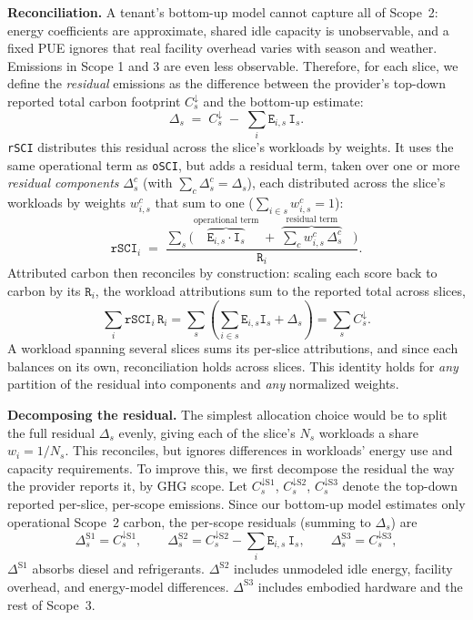 \documentclass[sigconf]{acmart}
\newcommand{\parag}[1]{\vspace{2mm}\noindent\textbf{#1.}\hspace{2mm}}
\newcommand{\RSCI}{\texttt{rSCI}\xspace}
\newcommand{\OSCI}{\texttt{oSCI}\xspace}
\newcommand{\E}{\texttt{E}\xspace}
\newcommand{\I}{\texttt{I}\xspace}
\newcommand{\R}{\texttt{R}\xspace}
\begin{document}
\parag{Reconciliation}
A tenant's bottom-up model cannot capture all of Scope~2: energy coefficients are approximate, shared idle capacity is unobservable, and a fixed PUE ignores that real facility overhead varies with season and weather.
Emissions in Scope 1 and 3 are even less observable.
Therefore, for each slice, we define the \emph{residual} emissions as the difference between the provider's top-down reported total carbon footprint $C^{\downarrow}_{s}$ and the bottom-up estimate:
\begin{equation}
\Delta_{s} \;=\; C^{\downarrow}_{s} \;-\; \sum_i \E_{i,s}\,\I_s .
\label{eq:residual-total}
\end{equation}
\RSCI distributes this residual across the slice's workloads by weights.
It uses the same operational term as \OSCI, but adds a residual term, taken over one or more \emph{residual components} $\Delta^{c}_s$ (with $\sum_c \Delta^{c}_s = \Delta_s$), each distributed across the slice's workloads by weights $w^{c}_{i,s}$ that sum to one ($\sum_{i \in s} w^{c}_{i,s} = 1$):
\begin{equation}
\RSCI_i \;=\; \frac{\sum_s \bigl( \overbrace{\E_{i,s}\cdot\I_s}^\text{operational term} \;+\; \overbrace{\textstyle\sum_c w^{c}_{i,s}\,\Delta^{c}_{s}}^\text{residual term}\;\;\;\bigr)}{\R_i}.
\label{eq:rsci}
\end{equation}
Attributed carbon then reconciles by construction: scaling each score back to carbon by its $\R_i$, the workload attributions sum to the reported total across slices,
\begin{equation}
\textstyle\sum_i \RSCI_i\,\R_i
=
\textstyle\sum_s
\left(
\sum_{i \in s} \E_{i,s}\I_s
+
\Delta_s
\right)
=
\textstyle\sum_s C^\downarrow_s .
\label{eq:reconcile}
\end{equation}
A workload spanning several slices sums its per-slice attributions, and since each balances on its own, reconciliation holds across slices.
This identity holds for \emph{any} partition of the residual into components and \emph{any} normalized weights.

\parag{Decomposing the residual}
The simplest allocation choice would be to split the full residual $\Delta_s$ evenly, giving each of the slice's $N_s$ workloads a share $w_i = 1/N_s$.
This reconciles, but ignores differences in workloads' energy use and capacity requirements.
To improve this, we first decompose the residual the way the provider reports it, by GHG scope.
Let $C_{s}^{\downarrow\text{S1}}$, $C_{s}^{\downarrow\text{S2}}$, $C_{s}^{\downarrow\text{S3}}$ denote the top-down reported per-slice, per-scope emissions.
Since our bottom-up model estimates only operational Scope~2 carbon, the per-scope residuals (summing to $\Delta_s$) are
\begin{equation}
\Delta^{\text{S1}}_{s} = C^{\downarrow\text{S1}}_{s}, \qquad
\Delta^{\text{S2}}_{s} = C^{\downarrow\text{S2}}_{s} - \sum_i \E_{i,s}\,\I_s, \qquad
\Delta^{\text{S3}}_{s} = C^{\downarrow\text{S3}}_{s},
\label{eq:residual-scopes}
\end{equation}
$\Delta^{\text{S1}}$ absorbs diesel and refrigerants.
$\Delta^{\text{S2}}$ includes unmodeled idle energy, facility overhead, and energy-model differences.
$\Delta^{\text{S3}}$ includes embodied hardware and the rest of Scope~3.
\end{document}
